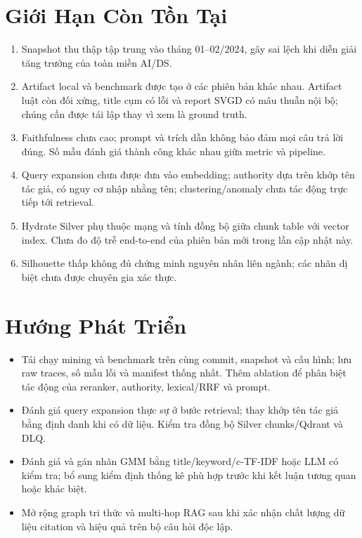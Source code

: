 \section{Giới Hạn Còn Tồn Tại}
\begin{enumerate}
\item Snapshot thu thập tập trung vào tháng 01--02/2024, gây sai lệch khi diễn giải tăng trưởng của toàn miền AI/DS.
\item Artifact local và benchmark được tạo ở các phiên bản khác nhau. Artifact luật còn đối xứng, title cụm có lỗi và report SVGD có mâu thuẫn nội bộ; chúng cần được tái lập thay vì xem là ground truth.
\item Faithfulness chưa cao; prompt và trích dẫn không bảo đảm mọi câu trả lời đúng. Số mẫu đánh giá thành công khác nhau giữa metric và pipeline.
\item Query expansion chưa được đưa vào embedding; authority dựa trên khớp tên tác giả, có nguy cơ nhập nhằng tên; clustering/anomaly chưa tác động trực tiếp tới retrieval.
\item Hydrate Silver phụ thuộc mạng và tính đồng bộ giữa chunk table với vector index. Chưa đo độ trễ end-to-end của phiên bản mới trong lần cập nhật này.
\item Silhouette thấp không đủ chứng minh nguyên nhân liên ngành; các nhãn dị biệt chưa được chuyên gia xác thực.
\end{enumerate}

\section{Hướng Phát Triển}
\begin{itemize}
\item Tái chạy mining và benchmark trên cùng commit, snapshot và cấu hình; lưu raw traces, số mẫu lỗi và manifest thống nhất. Thêm ablation để phân biệt tác động của reranker, authority, lexical/RRF và prompt.
\item Đánh giá query expansion thực sự ở bước retrieval; thay khớp tên tác giả bằng định danh khi có dữ liệu. Kiểm tra đồng bộ Silver chunks/Qdrant và DLQ.
\item Đánh giá và gán nhãn GMM bằng title/keyword/c-TF-IDF hoặc LLM có kiểm tra; bổ sung kiểm định thống kê phù hợp trước khi kết luận tương quan hoặc khác biệt.
\item Mở rộng graph tri thức và multi-hop RAG sau khi xác nhận chất lượng dữ liệu citation và hiệu quả trên bộ câu hỏi độc lập.
\end{itemize}
